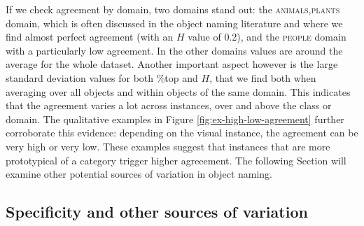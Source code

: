 If we check agreement by domain, two domains stand out: the \textsc{animals,plants} domain, which is often discussed in the object naming literature and where we find almost perfect agreement (with an $H$ value of 0.2), and the \textsc{people} domain with a particularly low agreement.
In the other domains values are around the average for the whole dataset.
Another important aspect however is the large standard deviation values for both \%top and $H$, that we find both when averaging over all objects and within objects of the same domain. This indicates that the agreement varies a lot across instances, over and above the class or domain.
The qualitative examples in Figure \ref{fig:ex-high-low-agreement} further corroborate this evidence: depending on the visual instance, the agreement can be very high or very low.
These examples suggest that instances that are more prototypical of a category trigger higher agreeement.
The following Section will examine other potential sources of variation in object naming.


\subsection{Specificity and other sources of variation}

